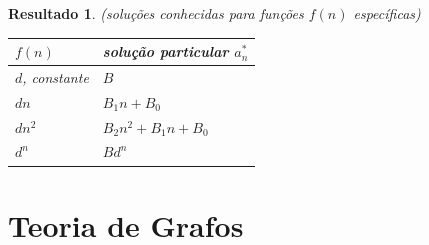 \documentclass[12pt]{article}
\theoremstyle{plain}
\newtheorem{res}[thm]{Resultado}
\theoremstyle{definition}
\theoremstyle{remark}
\begin{document}
\begin{res} (soluções conhecidas para funções \(f(n)\) específicas) \vspace{2mm}\newline
    \begin{tabular}[c]{ll}
        \(f(n)\) & \textup{solução particular} \(a^{*}_{n}\) \\
        \hline
        \(d\)\textup{, constante} & \(B\) \\
        \(dn\) & \(B_1n + B_0\) \\
        \(dn^2\) & \(B_2 n^2 + B_1 n + B_0\) \\
        \(d^n\) & \(B d^n\) \\
    \end{tabular}
\end{res}

\section{Teoria de Grafos}
\end{document}
